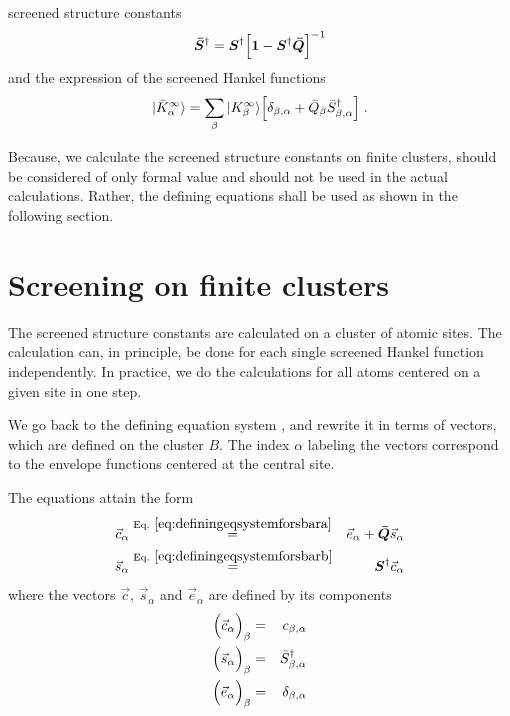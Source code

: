\documentclass[11pt,a4paper]{report}
\begin{document}
\begin{myshadowminipage}{screened structure constants}
\begin{eqnarray}
\bm{\bar{S}}^\dagger=\bm{S}^\dagger
\Bigl[\bm{1}-\bm{S}^\dagger\bm{\bar{Q}}\Bigr]^{-1}
\label{eq:defscreenedstructureconstants}
\end{eqnarray}
and the expression of the screened Hankel functions 
\begin{eqnarray}
|\bar{K}^\infty_\alpha\rangle=\sum_\beta |K^\infty_\beta\rangle
\Bigl[\delta_{\beta,\alpha}+
\bar{Q}_\beta \bar{S}^\dagger_{\beta,\alpha}\Bigr]
\;.
\end{eqnarray}

Because, we calculate the screened structure constants on finite
clusters,  should be considered
of only formal value and should not be used in the actual
calculations. Rather, the defining equations
 shall be used as shown in the
following section.
\end{myshadowminipage}{}

\section{Screening on finite clusters}
The screened structure constants are calculated on a cluster of atomic
sites. The calculation can, in principle, be done for each single
screened Hankel function independently. In practice, we do the
calculations for all atoms centered on a given site in one step.

We go back to the defining equation system
,  and
rewrite it in terms of vectors, which are defined on the cluster
$B$. The index $\alpha$ labeling the vectors correspond to the
envelope functions centered at the central site.

The equations attain the form
\begin{eqnarray}
\vec{c}_\alpha&\eqrel{eq:definingeqsystemforsbara}{=}&
\vec{e}_\alpha+\mat{\bar{Q}}\vec{s}_\alpha
\label{eq:definingeqsystemforsbarveca}
\\
\vec{s}_\alpha&\eqrel{eq:definingeqsystemforsbarb}{=}&
\mat{S}^\dagger\vec{c}_\alpha
\label{eq:definingeqsystemforsbarvecb}
\label{eq:definingeqsystemforsbarvec}
\end{eqnarray}
where the vectors $\vec{c}$, $\vec{s}_\alpha$ and $\vec{e}_\alpha$ are
defined by its components
\begin{eqnarray}
\Bigl(\vec{c}_\alpha\Bigr)_\beta&=&c_{\beta,\alpha}
\nonumber\\
\Bigl(\vec{s}_\alpha\Bigr)_\beta&=&\bar{S}^\dagger_{\beta,\alpha}
\nonumber\\
\Bigl(\vec{e}_\alpha\Bigr)_\beta&=&\delta_{\beta,\alpha}
\end{eqnarray}
\end{document}
